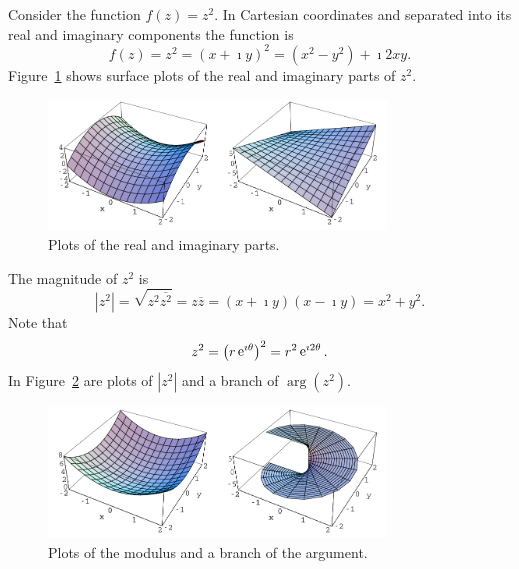 \begin{Example}
  Consider the function $f(z) = z^2$.  In Cartesian coordinates and separated
  into its real and imaginary components the function is
  \[
  f(z) = z^2 = (x + \imath y)^2 = \left( x^2 - y^2 \right) + \imath 2 x y.
  \]
  Figure~\ref{zsqrreim} shows surface plots of the real and imaginary parts
  of $z^2$.
  \begin{figure}[htbp!]
    \begin{center}
        \includegraphics[width=0.8\textwidth]{fcv/function/zsqrreim}
    \end{center}
    \caption{Plots of the real and imaginary parts.}
    \label{zsqrreim}
  \end{figure}
  The magnitude of $z^2$ is
  \[
  |z^2| = \sqrt{z^2 \overline{z^2} } = z \overline{z} 
  = (x + \imath y) (x - \imath y) = x^2 + y^2.
  \]
  Note that 
  \[
  z^2 = \left( r \mathop{\mathrm{e}}\nolimits^{\imath \theta} \right)^2 = r^2 \mathop{\mathrm{e}}\nolimits^{\imath 2 \theta}.
  \]
  In Figure~\ref{zsqrma} are plots of $|z^2|$ and a branch of 
  $\arg \left( z^2 \right)$.
  \begin{figure}[htbp!]
    \begin{center}
      \includegraphics[width=0.8\textwidth]{fcv/function/zsqrma}
    \end{center}
    \caption{Plots of the modulus and a branch of the argument.}
    \label{zsqrma}
  \end{figure}
\end{Example}























